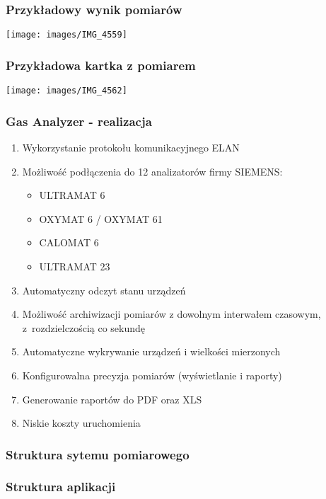 \documentclass[ucs]{beamer}
\begin{document}
\begin{frame}
\frametitle{Przykładowy wynik pomiarów}
\begin{center}
\texttt{[image: images/IMG\_4559]}
\end{center}
\end{frame}

\begin{frame}
\frametitle{Przykładowa kartka z pomiarem}
\begin{center}
\texttt{[image: images/IMG\_4562]}
\end{center}
\end{frame}

\begin{frame}
\frametitle{Gas Analyzer - realizacja}
\begin{enumerate}
\item Wykorzystanie protokołu komunikacyjnego ELAN
\item Możliwość podłączenia do 12 analizatorów firmy SIEMENS:
\begin{itemize}
\item ULTRAMAT 6
\item OXYMAT 6 / OXYMAT 61
\item CALOMAT 6
\item ULTRAMAT 23
\end{itemize}
\item Automatyczny odczyt stanu urządzeń
\item Możliwość archiwizacji pomiarów z dowolnym interwałem czasowym, z~rozdzielczością co sekundę
\item Automatyczne wykrywanie urządzeń i wielkości mierzonych
\item Konfigurowalna precyzja pomiarów (wyświetlanie i raporty)
\item Generowanie raportów do PDF oraz XLS
\item Niskie koszty uruchomienia
\end{enumerate}
\end{frame}

\begin{frame}
\frametitle{Struktura sytemu pomiarowego}

\end{frame}

\begin{frame}
\frametitle{Struktura aplikacji}
\begin{center}

\end{center}
\end{frame}
\end{document}
